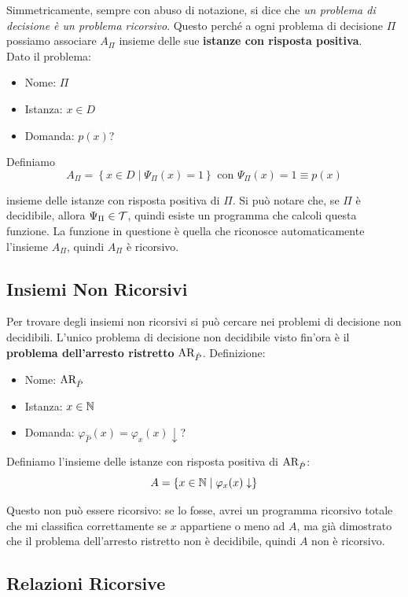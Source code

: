 Simmetricamente, sempre con abuso di notazione, si dice che \textit{un problema di decisione è un problema ricorsivo}. Questo perché a ogni problema di decisione $\Pi$ possiamo associare $A_\Pi$ insieme delle sue \textbf{istanze con risposta positiva}.\\

Dato il problema: 
\begin{itemize}
	\item Nome: $\Pi$
	\item Istanza: $x \in D$
	\item Domanda: $p(x)$?
\end{itemize}

Definiamo
$$ A_\Pi = \left\{x \in D \mid \Psi_\Pi (x) = 1\right\} \text{ con } \Psi_\Pi (x) = 1 \equiv p(x) $$

insieme delle istanze con risposta positiva di $\Pi$. Si può notare che, se $\Pi$ è decidibile, allora $\Psi_\Pi \in \mathcal{T}$, quindi esiste un programma che calcoli questa funzione. La funzione in questione è quella che riconosce automaticamente l'insieme $A_\Pi$, quindi $A_\Pi$ è ricorsivo.\\

\subsection{Insiemi Non Ricorsivi}

Per trovare degli insiemi non ricorsivi si può cercare nei problemi di decisione non decidibili. L'unico problema di decisione non decidibile visto fin'ora è il \textbf{problema dell'arresto ristretto} $\text{AR}_{\hat{P}}$. Definizione:
\begin{itemize}
	\item Nome: $\text{AR}_{\hat{P}}$
	\item Istanza: $x \in \mathbb{N}$
	\item Domanda: $\varphi_{\hat{P}} (x) = \varphi_x (x) \downarrow$?
\end{itemize}

Definiamo l'insieme delle istanze con risposta positiva di $\text{AR}_{\hat{P}}$:
$$ A = \left\{x \in \mathbb{N} \mid \varphi_x (x) \downarrow \right\}$$

Questo non può essere ricorsivo: se lo fosse, avrei un programma ricorsivo totale che mi classifica correttamente se $x$ appartiene o meno ad $A$, ma già dimostrato che il problema dell'arresto ristretto non è decidibile, quindi $A$ non è ricorsivo. \\

\subsection{Relazioni Ricorsive}

